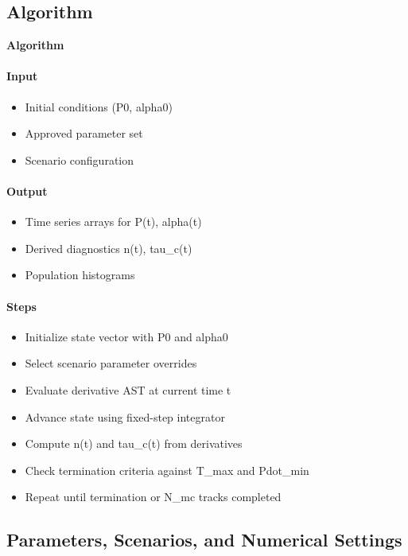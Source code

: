 \documentclass[11pt]{article}
\begin{document}
\subsection{Algorithm}

\noindent\textbf{Algorithm}
\paragraph{Input}
\begin{itemize}
\item Initial conditions (P0, alpha0)
\item Approved parameter set
\item Scenario configuration
\end{itemize}
\paragraph{Output}
\begin{itemize}
\item Time series arrays for P(t), alpha(t)
\item Derived diagnostics n(t), tau\_c(t)
\item Population histograms
\end{itemize}
\paragraph{Steps}
\begin{itemize}
\item Initialize state vector with P0 and alpha0
\item Select scenario parameter overrides
\item Evaluate derivative AST at current time t
\item Advance state using fixed-step integrator
\item Compute n(t) and tau\_c(t) from derivatives
\item Check termination criteria against T\_max and Pdot\_min
\item Repeat until termination or N\_mc tracks completed
\end{itemize}

\subsection{Parameters, Scenarios, and Numerical Settings}
\end{document}
